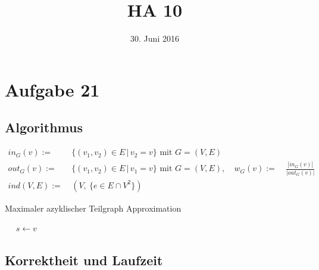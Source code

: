 



\title{HA 10}
\date{30. Juni 2016}

\maketitle

\section*{Aufgabe 21}
\label{sec:Aufgabe 21}

\subsection{Algorithmus}
\label{sub:Algorithmus}

\begin{align*}
	in_G(v) :=&\ \{ (v_1, v_{2}) \in E\, |\, v_2 = v  \} \text{ mit $G = (V, E)$} \\
	out_G(v) :=&\ \{ (v_1, v_{2}) \in E\, |\, v_1 = v  \} \text{ mit $G = (V, E)$},\ & w_G(v) := &\ \frac{|in_G(v)|}{|out_G(v)|} \\
	ind(V, E) :=&\ (V,\ \{ e \in E \cap V^{2} \})
\end{align*}

\begin{algorithm}
	\caption{Maximaler azyklischer Teilgraph Approximation}
	\begin{algorithmic}[1]
				\Return{$\emptyset$}
			\EndIf\
			\Statex\
					$s \gets v$
				\EndIf\
			\EndFor\
		\EndFunction\
	\end{algorithmic}
\end{algorithm}

\subsection{Korrektheit und Laufzeit}
\label{sub:Korrektheit und Laufzeit}


